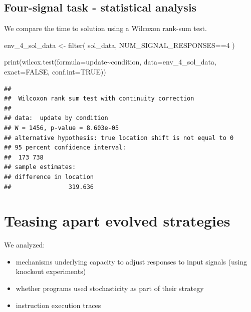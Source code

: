 \documentclass[
]{book}
\newenvironment{Shaded}{\begin{snugshade}}{\end{snugshade}}
\newcommand{\AttributeTok}[1]{\textcolor[rgb]{0.77,0.63,0.00}{#1}}
\newcommand{\ConstantTok}[1]{\textcolor[rgb]{0.00,0.00,0.00}{#1}}
\newcommand{\DecValTok}[1]{\textcolor[rgb]{0.00,0.00,0.81}{#1}}
\newcommand{\FunctionTok}[1]{\textcolor[rgb]{0.00,0.00,0.00}{#1}}
\newcommand{\NormalTok}[1]{#1}
\newcommand{\OtherTok}[1]{\textcolor[rgb]{0.56,0.35,0.01}{#1}}
\newcommand{\SpecialCharTok}[1]{\textcolor[rgb]{0.00,0.00,0.00}{#1}}
\providecommand{\tightlist}{%
  \setlength{\itemsep}{0pt}\setlength{\parskip}{0pt}}
\begin{document}
\hypertarget{four-signal-task---statistical-analysis}{%
\subsection{Four-signal task - statistical analysis}\label{four-signal-task---statistical-analysis}}

We compare the time to solution using a Wilcoxon rank-sum test.

\begin{Shaded}
\begin{Highlighting}[]
\NormalTok{env\_4\_sol\_data }\OtherTok{\textless{}{-}} \FunctionTok{filter}\NormalTok{(}
\NormalTok{  sol\_data,}
\NormalTok{  NUM\_SIGNAL\_RESPONSES}\SpecialCharTok{==}\DecValTok{4}
\NormalTok{)}

\FunctionTok{print}\NormalTok{(}\FunctionTok{wilcox.test}\NormalTok{(}\AttributeTok{formula=}\NormalTok{update}\SpecialCharTok{\textasciitilde{}}\NormalTok{condition, }\AttributeTok{data=}\NormalTok{env\_4\_sol\_data, }\AttributeTok{exact=}\ConstantTok{FALSE}\NormalTok{, }\AttributeTok{conf.int=}\ConstantTok{TRUE}\NormalTok{))}
\end{Highlighting}
\end{Shaded}

\begin{verbatim}
## 
##  Wilcoxon rank sum test with continuity correction
## 
## data:  update by condition
## W = 1456, p-value = 8.603e-05
## alternative hypothesis: true location shift is not equal to 0
## 95 percent confidence interval:
##  173 738
## sample estimates:
## difference in location 
##                319.636
\end{verbatim}

\hypertarget{teasing-apart-evolved-strategies}{%
\section{Teasing apart evolved strategies}\label{teasing-apart-evolved-strategies}}

We analyzed:

\begin{itemize}
\tightlist
\item
  mechanisms underlying capacity to adjust responses to input signals (using knockout experiments)
\item
  whether programs used stochasticity as part of their strategy
\item
  instruction execution traces
\end{itemize}
\end{document}
